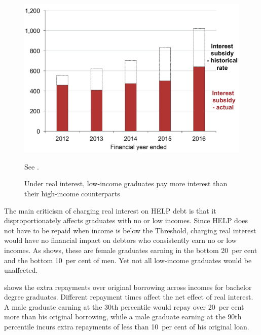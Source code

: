 \documentclass[embargoed]{grattan}
\begin{document}
\begin{figure}[t]\vspace{1pt}
\caption{Under real interest, low-income graduates pay more interest than their high-income counterparts}\label{fig:fig13-under-real-interest-low-income-grads-pay-more-interest-than-high-income-counterparts}


\includegraphics[page=13]{atlas/Chartpack.pdf}

%
{See .}
\end{figure}

The main criticism of charging real interest on \gls{HELP} debt is that it disproportionately affects graduates with no or low incomes.
Since  \gls{HELP} does not have to be repaid when income is below the \gls{Threshold}, charging real interest would have no financial impact on debtors who consistently earn no or low incomes.
As  shows, these are female graduates earning in the bottom 20~per cent and the bottom 10~per cent of men.
Yet not all low-income graduates would be unaffected.

 shows the extra repayments over original borrowing across incomes for bachelor degree graduates.
Different repayment times affect the net effect of real interest.
A male graduate earning at the 30{th} percentile would repay over 20~per cent more than his original borrowing, while a male graduate earning at the 90th percentile incurs extra repayments of less than 10~per cent of his original loan.
\end{document}
